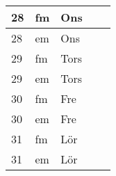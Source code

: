 \documentclass[a4paper]{article}
\begin{document}
\begin{table}[ht!]
\begin{tabular}{lllp{7cm}p{7cm}}
\multicolumn{1}{|l|}{28} & \multicolumn{1}{l|}{fm} & \multicolumn{1}{l|}{Ons} & \multicolumn{1}{l|}{} & \multicolumn{1}{l|}{} \\ \hline
\multicolumn{1}{|l|}{28} & \multicolumn{1}{l|}{em} & \multicolumn{1}{l|}{Ons} & \multicolumn{1}{l|}{} & \multicolumn{1}{l|}{} \\ \hline    

\multicolumn{1}{|l|}{29} & \multicolumn{1}{l|}{fm} & \multicolumn{1}{l|}{Tors} & \multicolumn{1}{l|}{} & \multicolumn{1}{l|}{} \\ \hline
\multicolumn{1}{|l|}{29} & \multicolumn{1}{l|}{em} & \multicolumn{1}{l|}{Tors} & \multicolumn{1}{l|}{} & \multicolumn{1}{l|}{} \\ \hline    

\multicolumn{1}{|l|}{30} & \multicolumn{1}{l|}{fm} & \multicolumn{1}{l|}{Fre} & \multicolumn{1}{l|}{} & \multicolumn{1}{l|}{} \\ \hline
\multicolumn{1}{|l|}{30} & \multicolumn{1}{l|}{em} & \multicolumn{1}{l|}{Fre} & \multicolumn{1}{l|}{} & \multicolumn{1}{l|}{} \\ \hline    

\multicolumn{1}{|l|}{31} & \multicolumn{1}{l|}{fm} & \multicolumn{1}{l|}{Lör} & \multicolumn{1}{l|}{} & \multicolumn{1}{l|}{} \\ \hline
\multicolumn{1}{|l|}{31} & \multicolumn{1}{l|}{em} & \multicolumn{1}{l|}{Lör} & \multicolumn{1}{l|}{} & \multicolumn{1}{l|}{} \\ \hline    

    \end{tabular}
    \end{table}
    
\end{document}
